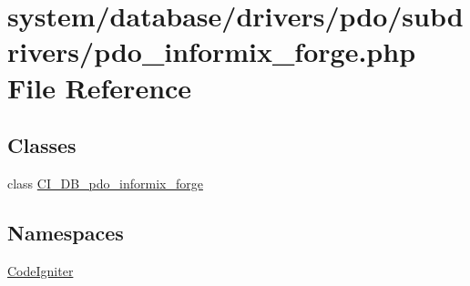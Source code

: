 \hypertarget{pdo__informix__forge_8php}{}\section{system/database/drivers/pdo/subdrivers/pdo\+\_\+informix\+\_\+forge.php File Reference}
\label{pdo__informix__forge_8php}
\subsection*{Classes}
\begin{DoxyCompactItemize}
\item 
class \mbox{\hyperlink{class_c_i___d_b__pdo__informix__forge}{C\+I\+\_\+\+D\+B\+\_\+pdo\+\_\+informix\+\_\+forge}}
\end{DoxyCompactItemize}
\subsection*{Namespaces}
\begin{DoxyCompactItemize}
\item 
 \mbox{\hyperlink{namespace_code_igniter}{Code\+Igniter}}
\end{DoxyCompactItemize}
